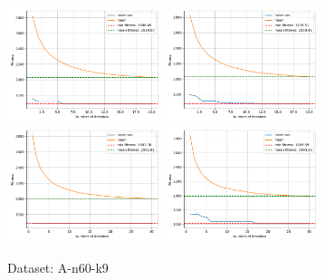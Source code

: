 \documentclass[12pt]{report}
\begin{document}
\begin{figure}[!ht]
	\centering
	\includegraphics[width=0.4\textwidth]{../CVRP/plots/A-n60-k9-20-20.png}
	\includegraphics[width=0.4\textwidth]{../CVRP/plots/A-n60-k9-20-30.png}
	\includegraphics[width=0.4\textwidth]{../CVRP/plots/A-n60-k9-30-20.png}
	\includegraphics[width=0.4\textwidth]{../CVRP/plots/A-n60-k9-30-30.png}
	\caption{Dataset: A-n60-k9}
	\label{fig:A-n60-k9}
\end{figure}

\end{document}
